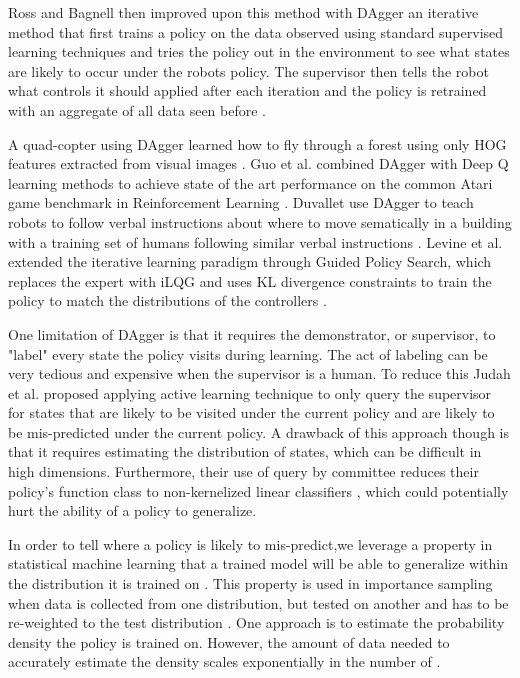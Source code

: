 \documentclass[10pt, conference]{ieeeconf}      %
\begin{document}
Ross and Bagnell then improved upon this method with DAgger an iterative method that first trains a policy on the data observed using standard supervised learning techniques and tries the policy out in the environment to see what states are likely to occur under the robots policy. The supervisor then tells the robot what controls it should applied after each iteration and the policy is retrained with an aggregate of all data seen before \cite{ross2010reduction}. 

A quad-copter using DAgger learned how to fly through a forest using only HOG features extracted from visual images \cite{ross2013learning}. Guo et al. combined DAgger with Deep Q learning methods to achieve state of the art performance on the common Atari game benchmark in Reinforcement Learning \cite{NIPS2014_5421}. Duvallet use DAgger to teach robots to follow verbal instructions about where to move sematically in a building with a training set of humans following similar verbal instructions \cite{duvallet2013imitation}. Levine et al. extended the iterative learning paradigm through Guided Policy Search, which replaces the expert with iLQG and uses KL divergence constraints to train the policy to match the distributions of the controllers \cite{levine2015end}.  


One limitation of DAgger is that it requires the demonstrator, or supervisor, to "label" every state the policy visits during learning. The act of labeling can be very tedious and expensive when the supervisor is a human. To reduce this Judah et al. proposed applying active learning technique to only query the supervisor for states that are likely to be visited under the current policy and are likely to be mis-predicted under the current policy\cite{judah2011active,judah2012active}. A drawback of this approach though is that it requires estimating the distribution of states, which can be difficult in high dimensions. Furthermore, their use of query by committee reduces their policy's function class to non-kernelized linear classifiers \cite{gilad2005query}, which could potentially hurt the ability of a policy to generalize.
 

In order to tell where a policy is likely to mis-predict,we  leverage a property in statistical machine learning that a trained model will be able to generalize within the distribution it is trained on \cite{tokdar2010importance}. This property is used in importance sampling when data is collected from one distribution, but tested on another and has to be re-weighted to the test distribution \cite{huang2006correcting}. One approach is to  estimate the probability density the policy is trained on. However, the amount of data needed to accurately estimate the density scales exponentially in the number of \cite{nadaraya1964estimating}.
\end{document}
